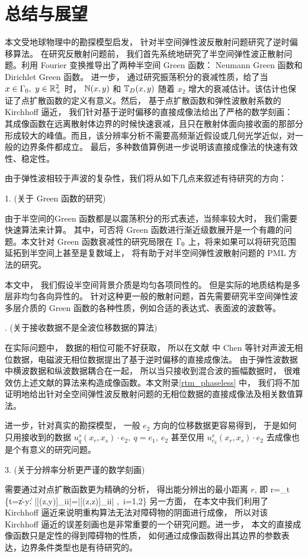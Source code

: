 \chapter{总结与展望} \label{chap:summary}

本文受地球物理中的勘探模型启发， 针对半空间弹性波反散射问题研究了逆时偏移算法。 在研究反散射问题前， 我们首先系统地研究了半空间弹性波正散射问题。利用 Fourier 变换推导出了两种半空间 Green 函数： Neumann Green 函数和 Dirichlet Green 函数。 进一步， 通过研究振荡积分的衰减性质，给了当 $x\in \Gamma_0, \ y\in \mathbb{R}^2_+$ 时， $\mathbb{N}(x,y)$ 和 $\mathbb{T}_D(x,y)$ 随着 $x_2$ 增大的衰减估计。该估计也保证了点扩散函数的定义有意义。然后， 基于点扩散函数和弹性波散射系数的 Kirchhoff 逼近， 我们针对基于逆时偏移的直接成像法给出了严格的数学刻画： 其成像函数在远离散射体边界的时候快速衰减，且只在散射体面向接收面的那部分形成较大的峰值。而且，该分辨率分析不需要高频渐近假设或几何光学近似，对一般的边界条件都成立。 最后，多种数值算例进一步说明该直接成像法的快速有效性、稳定性。

由于弹性波相较于声波的复杂性，我们将从如下几点来叙述有待研究的方向：

1. (关于 Green 函数的研究)

由于半空间的Green 函数都是以震荡积分的形式表述，当频率较大时， 我们需要快速算法来计算。 其中，可否将 Green 函数进行渐近级数展开是一个有趣的问题。本文针对 Green 函数衰减性的研究局限在 $\Gamma_0$ 上，将来如果可以将研究范围延拓到半空间上甚至是复数域上， 将有助于对半空间弹性波散射问题的 PML 方法的研究。

 本文中， 我们假设半空间背景介质是均匀各项同性的。 但是实际的地质结构是多层非均匀各向异性的。 针对这种更一般的散射问题，首先需要研究半空间弹性波多层介质的 Green 函数的各种性质，例如合适的表达式、表面波的波数等。 

. (关于接收数据不是全波位移数据的算法)

在实际问题中， 数据的相位可能不好获取， 所以在文献 \cite{chen2016direct,chen2017direct,chen2017phaseless} 中 Chen 等针对声波无相位数据，电磁波无相位数据提出了基于逆时偏移的直接成像法。 由于弹性波数据中横波数据和纵波数据耦合在一起， 所以当只接收到混合波的振幅数据时， 很难效仿上述文献的算法来构造成像函数。本文附录\ref{rtm_phaseless} 中， 我们将不加证明地给出针对全空间弹性波反散射问题的无相位数据的直接成像法及相关数值算法。

进一步，针对真实的勘探模型， 一般 $e_2$ 方向的位移数据更容易得到， 于是如何只用接收到的数据 $u^s_q(x_r,x_s)\cdot e_2, \ q=e_1, \ e_2$ 甚至仅用 $u^s_{e_2}(x_r,x_s)\cdot e_2$ 去成像也是个有意义的研究问题。

\bigskip

3. (关于分辨率分析更严谨的数学刻画)

需要通过对点扩散函数更为精确的分析， 得出能分辨出的最小距离 $r$, 即
\ben
r=\inf_{t} \{t=\|z-y\| : |[\J(z,y)]_{ii}|=|[\J(z,z)]_{ii}| ,\ i=1,2\}
\een
另一方面， 在本文中我们利用了 Kirchhoff 逼近来说明重构算法无法对障碍物的阴面进行成像， 所以对该 Kirchhoff 逼近的误差刻画也是非常重要的一个研究问题。进一步， 本文的直接成像函数只是定性的得到障碍物的性质， 如何通过成像函数得出其边界的参数表达，边界条件类型也是有待研究的。

